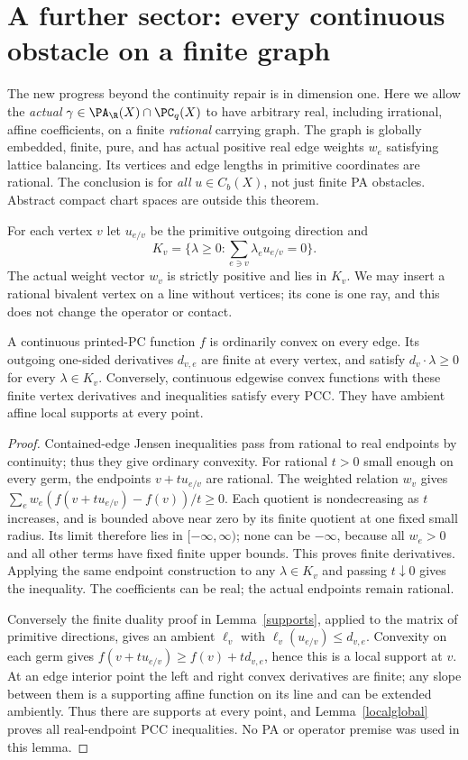 \section{A further sector: every continuous obstacle on a finite graph}\label{graph-sector}
The new progress beyond the continuity repair is in dimension one. Here
we allow the \emph{actual} $\gamma\in\PA_\R(X)\cap\PC_q(X)$ to have
arbitrary real, including irrational, affine coefficients, on a finite
\emph{rational} carrying graph. The graph is globally embedded, finite,
pure, and has actual positive real edge weights $w_e$ satisfying lattice
balancing. Its vertices and edge lengths in primitive coordinates are
rational. The conclusion is for \emph{all} $u\in C_b(X)$, not just finite
PA obstacles. Abstract compact chart spaces are outside this theorem.

For each vertex $v$ let $u_{e/v}$ be the primitive outgoing direction and
\[
 K_v=\{\lambda\geq0:\sum_{e\ni v}\lambda_eu_{e/v}=0\}.
\]
The actual weight vector $w_v$ is strictly positive and lies in $K_v$.
We may insert a rational bivalent vertex on a line without vertices;
its cone is one ray, and this does not change the operator or contact.

\begin{lemma}\label{graph-slopes}
A continuous printed-PC function $f$ is ordinarily convex on every edge.
Its outgoing one-sided derivatives $d_{v,e}$ are finite at every vertex,
and satisfy $d_v\cdot\lambda\geq0$ for every $\lambda\in K_v$.
Conversely, continuous edgewise convex functions with these finite
vertex derivatives and inequalities satisfy every PCC. They have
ambient affine local supports at every point.
\end{lemma}
\begin{proof}
Contained-edge Jensen inequalities pass from rational to real endpoints
by continuity; thus they give ordinary convexity. For rational $t>0$
small enough on every germ, the endpoints $v+t u_{e/v}$ are rational.
The weighted relation $w_v$ gives
$\sum_e w_e(f(v+tu_{e/v})-f(v))/t\geq0$.
Each quotient is nondecreasing as $t$ increases, and is bounded above
near zero by its finite quotient at one fixed small radius. Its limit
therefore lies in $[-\infty,\infty)$; none can be $-\infty$, because
all $w_e>0$ and all other terms have fixed finite upper bounds.
This proves finite derivatives. Applying the same endpoint construction
to any $\lambda\in K_v$ and passing $t\downarrow0$ gives the inequality.
The coefficients can be real; the actual endpoints remain rational.

Conversely the finite duality proof in Lemma~\ref{supports}, applied
to the matrix of primitive directions, gives an ambient $\ell_v$ with
$\ell_v(u_{e/v})\leq d_{v,e}$. Convexity on each germ gives
$f(v+tu_{e/v})\geq f(v)+t d_{v,e}$, hence this is a local support
at $v$. At an edge interior point the left and right convex derivatives
are finite; any slope between them is a supporting affine function
on its line and can be extended ambiently. Thus there are supports at
every point, and Lemma~\ref{localglobal} proves all real-endpoint PCC
inequalities. No PA or operator premise was used in this lemma.
\end{proof}

